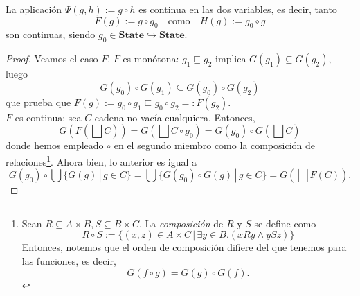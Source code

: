 \begin{lema}\label{dslema2}
La aplicación $\Psi(g, h) := g \circ h$ es continua en las dos variables, es decir, tanto
$$F(g) := g \circ g_0\quad \text{como}\quad H(g) := g_0 \circ g$$
son continuas, siendo $g_0 \in \mathbf{State}\hookrightarrow\mathbf{State}$.
\end{lema}
\begin{proof}
Veamos el caso $F$. $F$ es monótona: $g_1 \sqsubseteq g_2$ implica $G(g_1)\subseteq G(g_2)$, luego
$$G(g_0)\circ G(g_1) \subseteq G(g_0)\circ G(g_2)$$
que prueba que $F(g):=g_0\circ g_1\sqsubseteq g_0\circ g_2 =: F(g_2)$.
\\
$F$ es continua: sea $C$ cadena no vacía cualquiera. Entonces, 
$$G\left(F\left(\bigsqcup C\right)\right) = G\left(\bigsqcup C \circ g_0\right) = G(g_0)\circ G\left(\bigsqcup C\right)$$
donde hemos empleado $\circ$ en el segundo miembro como la composición de relaciones\footnote{Sean $R \subseteq A \times B, S \subseteq B \times C$. La \textit{composición} de $R$ y $S$ se define como
$$R \circ S := \{(x, z) \in A \times C \, | \, \exists y \in B.(xRy \land ySz)\}$$
Entonces, notemos que el orden de composición difiere del que tenemos para las funciones, es decir, $$G(f \circ g) = G(g) \circ G(f).$$}.
Ahora bien, lo anterior es igual a
$$G(g_0)\circ \bigcup \{G(g) \, | \, g \in C\} = \bigcup \{G(g_0)\circ G(g) \, | \, g \in C\} = G\left(\bigsqcup F(C)\right).$$
\end{proof}


